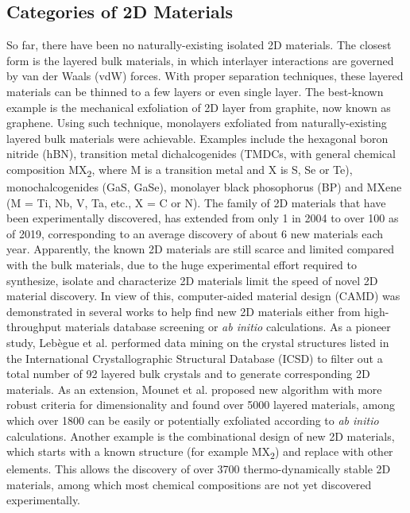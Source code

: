 

\subsection{Categories of 2D Materials}
\label{sec:categ-2d-mater}

So far, there have been no naturally-existing isolated 2D
materials. The closest form is the layered bulk materials, in which
interlayer interactions are governed by van der Waals (vdW) forces.
%
With proper separation techniques, these layered materials can be
thinned to a few layers or even single layer.
%
The best-known example is the mechanical exfoliation of 2D layer from graphite,
now known as graphene. 
%
Using such technique, monolayers exfoliated from naturally-existing
layered bulk materials were achievable. Examples include the hexagonal
boron nitride (hBN), transition metal dichalcogenides (TMDCs, with
general chemical composition MX\textsubscript{2}, where M is a
transition metal and X is S, Se or Te), monochalcogenides (GaS, GaSe),
monolayer black phosophorus (BP) and MXene (M = Ti, Nb, V, Ta, etc.,
X = C or N).
%
The family of 2D materials that have been experimentally discovered,
has extended from only 1 in 2004 to over 100  as of
2019, corresponding to an average discovery of about 6 new materials
each year. 
%
Apparently, the known 2D materials are still scarce and limited
compared with the bulk materials,
due to the huge experimental effort
required to synthesize, isolate and characterize 2D materials limit
the speed of novel 2D material discovery.
% 
In view of this, computer-aided material design (CAMD) was
demonstrated in several works to help find new 2D materials either
from high-throughput materials database screening or \textit{ab
  initio} calculations. As a pioneer study, Lebègue et al. performed
data mining on the crystal structures listed in the International
Crystallographic Structural Database (ICSD) to filter out a total
number of 92 layered bulk crystals and to generate corresponding 2D
materials. As an extension, Mounet et al. proposed new algorithm with
more robust criteria for dimensionality and found over 5000 layered
materials, among which over 1800 can be easily or potentially
exfoliated according to \textit{ab initio} calculations.
%
Another example is the combinational design of new 2D materials, which
starts with a known structure (for example MX\textsubscript{2}) and
replace with other elements. This allows the discovery of over 3700
thermo-dynamically stable 2D materials, among which most chemical
compositions are not yet discovered experimentally.

